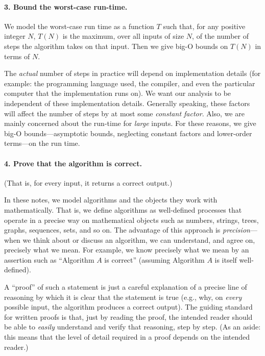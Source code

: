 \documentclass[11pt]{article}
\begin{document}
\paragraph{3. Bound the worst-case run-time.}
  We model the worst-case run time as a function $T$ such that, for any positive integer $N$, $T(N)$ is the maximum, over all inputs of size $N$, of the number of steps the algorithm takes on that input.  Then we give big-O bounds on $T(N)$ in terms of $N$.
  
  The \emph{actual} number of steps in practice will depend on implementation details (for example: the programming language used, the compiler, and even the particular computer that the implementation runs on).  We want our analysis to be independent of these implementation details.  Generally speaking, these factors will affect the number of steps by at most some \emph{constant factor}.  Also, we are mainly concerned about the run-time for \emph{large} inputs.  For these reasons, we give big-O bounds---asymptotic bounds, neglecting constant factors and lower-order terms---on the run time.

\paragraph{4. Prove that the algorithm is correct.} (That is, for every input, it returns a correct output.)

In these notes, we model algorithms and the objects they work with mathematically.  That is, we define algorithms as well-defined processes that operate in a precise way on mathematical objects such as numbers, strings, trees, graphs, sequences, sets, and so on.  The advantage of this approach is \emph{precision}---when we think about or discuss an algorithm, we can understand, and agree on, precisely what we mean.  For example, we know precisely what we mean by an assertion such as ``Algorithm $A$ is correct'' (assuming Algorithm $A$ is itself well-defined).

A ``proof'' of such a statement is just a careful explanation of a precise line of reasoning by which it is clear that the statement is true (e.g., why, on \emph{every} possible input, the algorithm produces a correct output).  The guiding standard for written proofs is that, just by reading the proof, the intended reader should be able to \emph{easily} understand and verify that reasoning, step by step.  (As an aside: this means that the level of detail required in a proof depends on the intended reader.)
\end{document}
